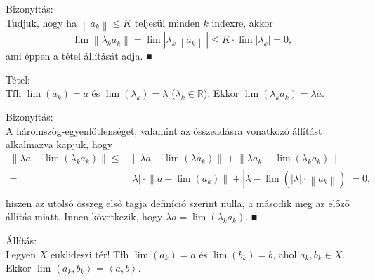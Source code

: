 \documentclass[12pt,a4paper]{scrartcl}
\newenvironment{tetel}{}{}
\newenvironment{bizonyitas}{}{}
\begin{document}
\begin{bizonyitas}

Bizonyítás:\\
Tudjuk, hogy ha \(\left\| a_{k} \right\| \leq K\) teljesül minden \(k\)
indexre, akkor
\[\lim\left\| {\lambda_{k}a_{k}} \right\| = \lim\left| {\lambda_{k}\left\| a_{k} \right\|} \right| \leq K \cdot \lim\left| \lambda_{k} \right| = 0,\]
ami éppen a tétel állítását adja. ■

\end{bizonyitas}

\begin{tetel}

Tétel:\\
Tfh \(\lim\left( a_{k} \right) = a\) és
\(\lim\left( \lambda_{k} \right) = \lambda\)
(\(\lambda_{k} \in {\mathbb{R}}\)). Ekkor
\(\lim\left( {\lambda_{k}a_{k}} \right) = \lambda a\).

\end{tetel}

\begin{bizonyitas}

Bizonyítás:\\
A háromszög-egyenlőtlenséget, valamint az összeadásra vonatkozó állítást
alkalmazva kapjuk, hogy \[\begin{aligned}
  \left\| {\lambda a - \lim \left( {{\lambda _k}{a_k}} \right)} \right\| \leqslant  & \left\| {\lambda a - \lim \left( {\lambda {a_k}} \right)} \right\| + \left\| {\lambda {a_k} - \lim \left( {{\lambda _k}{a_k}} \right)} \right\| \\ 
   =  & \left| \lambda  \right| \cdot \left\| {a - \lim \left( {{a_k}} \right)} \right\| + \left| {\lambda  - \lim \left( {\left| \lambda  \right| \cdot \left\| {{a_k}} \right\|} \right)} \right| = 0, \\ 
\end{aligned} \] hiszen az utolsó összeg első tagja definíció szerint
nulla, a második meg az előző állítás miatt. Innen következik, hogy
\(\lambda a = \lim\left( {\lambda_{k}a_{k}} \right)\). ■

\end{bizonyitas}

\begin{all_extra}

Állítás:\\
Legyen \(X\) euklideszi tér! Tfh \(\lim\left( a_{k} \right) = a\) és
\(\lim\left( b_{k} \right) = b\), ahol \(a_{k},b_{k} \in X\). Ekkor
\(\lim\left\langle {a_{k},b_{k}} \right\rangle = \left\langle {a,b} \right\rangle\).

\end{all_extra}
\end{document}
